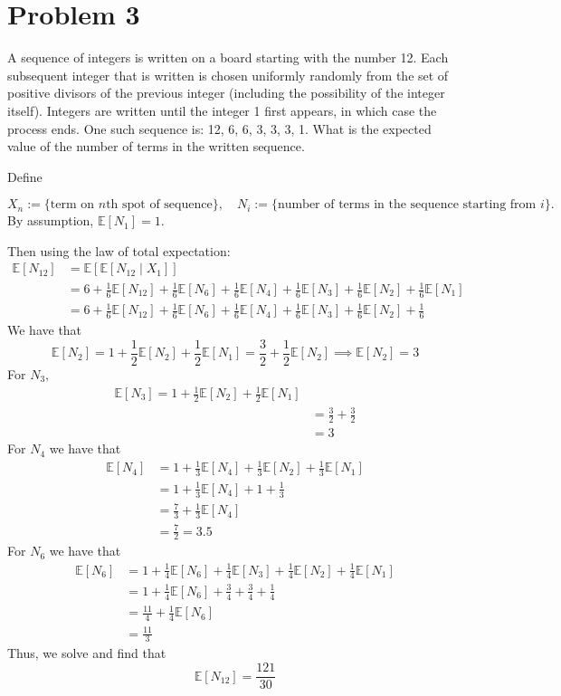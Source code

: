 \documentclass[11pt]{article}
\newcommand{\bbE}{\mathbb{E}}
\begin{document}
\section*{Problem 3}
\begin{problem}
A sequence of integers is written on a board starting with the number 12. Each subsequent integer that is written is chosen uniformly randomly from the set of positive divisors of the previous integer (including the possibility of the integer itself). Integers are written until the integer 1 first appears, in which case the process ends. One such sequence is: 12, 6, 6, 3, 3, 3, 1. What is the expected value of the number of terms in the written sequence.
\end{problem}
\begin{solution}
    Define 
    
    \[X_n := \{\text{term on $n$th spot of sequence}\}, \quad
    N_i := \{\text{number of terms in the sequence starting from $i$}\}.\] By assumption, $\bbE[N_1] = 1.$
    
    Then using the law of total expectation: 
\begin{align*}
    \bbE[N_{12}] &= \bbE[\bbE[N_{12} \mid X_1]]\\
    &= 6 + \frac{1}{6}\bbE[N_{12}] + \frac{1}{6}\bbE[N_6] + \frac{1}{6}\bbE[N_4] + \frac{1}{6}\bbE[N_3] + \frac{1}{6}\bbE[N_2] + \frac{1}{6}\bbE[N_1]\\
    &= 6 + \frac{1}{6}\bbE[N_{12}] + \frac{1}{6}\bbE[N_6] + \frac{1}{6}\bbE[N_4] + \frac{1}{6}\bbE[N_3] + \frac{1}{6}\bbE[N_2] + \frac{1}{6}
\end{align*}
We have that 
\[\bbE[N_2] = 1 + \frac{1}{2}\bbE[N_2] + \frac{1}{2}\bbE[N_1] = \frac{3}{2} + \frac{1}{2}\bbE[N_2] \implies \bbE[N_2] = 3\]
For $N_3,$
\begin{align*}
    \bbE[N_3] = 1 + \frac{1}{2}\bbE[N_2] + \frac{1}{2}\bbE[N_1]\\
    &= \frac{3}{2} + \frac{3}{2}\\
    &= 3
\end{align*}
For $N_4$ we have that
\begin{align*}
    \bbE[N_4] &= 1 + \frac{1}{3}\bbE[N_4] + \frac{1}{3}\bbE[N_2] + \frac{1}{3}\bbE[N_1]\\
    &= 1 + \frac{1}{3}\bbE[N_4] + 1 + \frac{1}{3}\\
    &= \frac{7}{3} + \frac{1}{3}\bbE[N_4]\\
    &= \frac{7}{2} = 3.5
\end{align*}
For $N_6$ we have that 
\begin{align*}
    \bbE[N_6] &= 1 + \frac{1}{4}\bbE[N_6] + \frac{1}{4}\bbE[N_3]+ \frac{1}{4}\bbE[N_2] + \frac{1}{4}\bbE[N_1]\\
    &= 1 + \frac{1}{4}\bbE[N_6] + \frac{3}{4} + \frac{3}{4} + \frac{1}{4}\\
    &= \frac{11}{4} + \frac{1}{4}\bbE[N_6]\\
    &= \frac{11}{3}
\end{align*}
Thus, we solve and find that
\[\bbE[N_{12}]= \frac{121}{30}\]

\end{solution}
\end{document}
